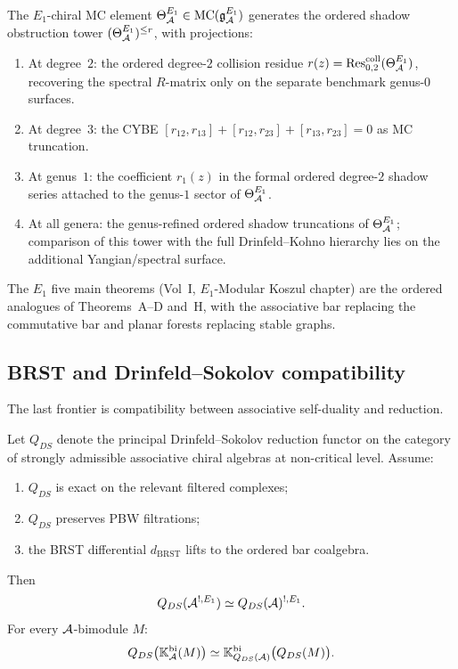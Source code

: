 \begin{construction}
The $E_1$-chiral MC element $\Theta^{E_1}_{\mathcal{A}} \in \mathrm{MC}(\mathfrak{g}^{E_1}_{\mathcal{A}})$ generates the ordered shadow obstruction tower $(\Theta^{E_1}_{\mathcal{A}})^{\leq r}$, with projections:
\begin{enumerate}[label=\textup{(\roman*)}]
\item At degree~$2$: the ordered degree-$2$ collision residue
 $r(z) = \mathrm{Res}^{\mathrm{coll}}_{0,2}(\Theta^{E_1}_{\mathcal{A}})$,
 recovering the spectral $R$-matrix only on the separate benchmark
 genus-$0$ surfaces.
\item At degree~$3$: the CYBE $[r_{12}, r_{13}] + [r_{12}, r_{23}] + [r_{13}, r_{23}] = 0$ as MC truncation.
\item At genus~$1$: the coefficient $r_1(z)$ in the formal ordered
 degree-$2$ shadow series attached to the genus-$1$ sector of
 $\Theta^{E_1}_{\mathcal{A}}$.
\item At all genera: the genus-refined ordered shadow truncations of
 $\Theta^{E_1}_{\mathcal{A}}$; comparison of this tower with the full
 Drinfeld--Kohno hierarchy lies on the additional Yangian/spectral
 surface.
\end{enumerate}
The $E_1$ five main theorems (Vol~I, $E_1$-Modular Koszul chapter) are the ordered analogues of Theorems~A--D and~H, with the associative bar replacing the commutative bar and planar forests replacing stable graphs.
\end{construction}

\subsection{BRST and Drinfeld--Sokolov compatibility}

The last frontier is compatibility between associative self-duality and reduction.

\begin{theorem}
Let $Q_{DS}$ denote the principal Drinfeld--Sokolov reduction functor
on the category of strongly admissible associative chiral algebras
at non-critical level. Assume:
\begin{enumerate}[label=(\alph*)]
\item $Q_{DS}$ is exact on the relevant filtered complexes;
\item $Q_{DS}$ preserves PBW filtrations;
\item the BRST differential $d_{\mathrm{BRST}}$ lifts to the ordered
 bar coalgebra.
\end{enumerate}
Then
\[
Q_{DS}(\mathcal{A}^{!,E_1})\simeq Q_{DS}(\mathcal{A})^{!,E_1}.
\]
For every $\mathcal{A}$-bimodule $M$\textup{:}
\[
Q_{DS}\bigl(\mathbb{K}_{\mathcal{A}}^{\mathrm{bi}}(M)\bigr)\simeq
\mathbb{K}_{Q_{DS}(\mathcal{A})}^{\mathrm{bi}}\bigl(Q_{DS}(M)\bigr).
\]
\end{theorem}

